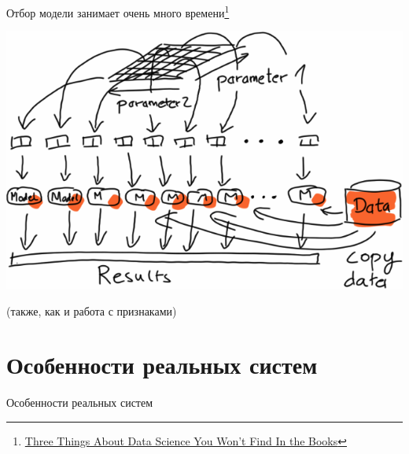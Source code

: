 \documentclass[10pt]{beamer}
\begin{document}
\begin{frame}{Отбор модели занимает очень много времени\footnote{\href{http://blog.mikiobraun.de/2015/03/three-things-about-data-science.html}{Three Things About Data Science You Won't Find In the Books}}}

\begin{center}
\includegraphics[scale=0.3]{images/evaluation.png}
\end{center}

(также, как и работа с признаками)

\end{frame}


\section{Особенности реальных систем}


\begin{frame}{}

\begin{center}
\Large Особенности реальных систем
\end{center}

\end{frame}
\end{document}
